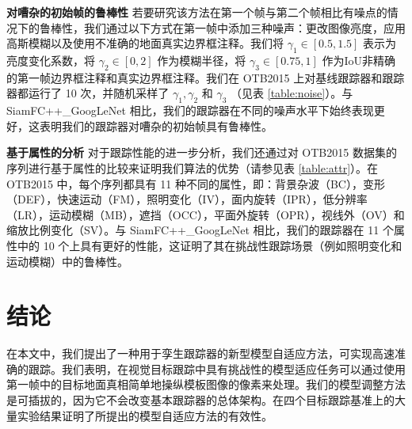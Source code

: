 \textbf{对嘈杂的初始帧的鲁棒性} 若要研究该方法在第一个帧与第二个帧相比有噪点的情况下的鲁棒性，我们通过以下方式在第一帧中添加三种噪声：更改图像亮度，应用高斯模糊以及使用不准确的地面真实边界框注释。我们将 $\gamma_1 \in [0.5, 1.5]$ 表示为亮度变化系数，将 $\gamma_2 \in [0, 2]$ 作为模糊半径，将 $\gamma_3 \in [0.75, 1]$ 作为IoU非精确的第一帧边界框注释和真实边界框注释。我们在 OTB2015 上对基线跟踪器和跟踪器都运行了 10 次，并随机采样了 $\gamma_1, \gamma_2$ 和 $\gamma_3$ （见表 \ref{table:noise}）。与 SiamFC++\_GoogLeNet \cite{SiamFC++} 相比，我们的跟踪器在不同的噪声水平下始终表现更好，这表明我们的跟踪器对嘈杂的初始帧具有鲁棒性。%

\textbf{基于属性的分析} 对于跟踪性能的进一步分析，我们还通过对 OTB2015 数据集的序列进行基于属性的比较来证明我们算法的优势（请参见表 \ref{table:attr}）。在 OTB2015 中，每个序列都具有 11 种不同的属性，即：背景杂波（BC），变形（DEF），快速运动（FM），照明变化（IV），面内旋转（IPR），低分辨率（LR），运动模糊（MB），遮挡（OCC），平面外旋转（OPR），视线外（OV）和缩放比例变化（SV）。与 SiamFC++\_GoogLeNet \cite{SiamFC++} 相比，我们的跟踪器在 11 个属性中的 10 个上具有更好的性能，这证明了其在挑战性跟踪场景（例如照明变化和运动模糊）中的鲁棒性。

\section{结论}
在本文中，我们提出了一种用于孪生跟踪器的新型模型自适应方法，可实现高速准确的跟踪。我们表明，在视觉目标跟踪中具有挑战性的模型适应任务可以通过使用第一帧中的目标地面真相简单地操纵模板图像的像素来处理。我们的模型调整方法是可插拔的，因为它不会改变基本跟踪器的总体架构。在四个目标跟踪基准上的大量实验结果证明了所提出的模型自适应方法的有效性。